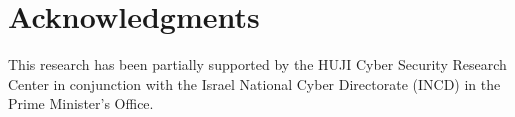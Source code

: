 \documentclass[letterpaper]{article} %
\begin{document}
\section*{Acknowledgments}
This research has been partially supported by the HUJI Cyber Security Research Center in conjunction with the Israel National Cyber Directorate (INCD) in the Prime Minister's Office.
\clearpage


\end{document}
